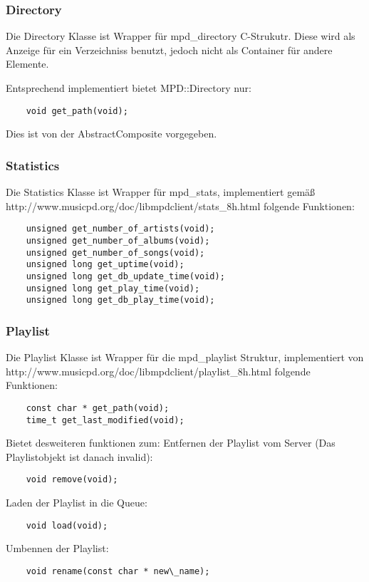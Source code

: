 \subsubsection{Directory}
Die Directory Klasse ist Wrapper für mpd\_directory C-Strukutr. Diese wird als Anzeige für ein Verzeichniss benutzt,
jedoch nicht als Container für andere Elemente.

Entsprechend implementiert bietet MPD::Directory nur:
\begin{verbatim}
    void get_path(void);
\end{verbatim}

Dies ist von der AbstractComposite vorgegeben.

\newpage
\subsubsection{Statistics}
Die Statistics Klasse ist Wrapper für mpd\_stats, implementiert gemäß
\\http://www.musicpd.org/doc/libmpdclient/stats\_8h.html
folgende Funktionen:
\begin{verbatim}
    unsigned get_number_of_artists(void);
    unsigned get_number_of_albums(void);
    unsigned get_number_of_songs(void);
    unsigned long get_uptime(void);
    unsigned long get_db_update_time(void);
    unsigned long get_play_time(void);
    unsigned long get_db_play_time(void);
\end{verbatim}


\subsubsection{Playlist}
Die Playlist Klasse ist Wrapper für die mpd\_playlist Struktur, implementiert von http://www.musicpd.org/doc/libmpdclient/playlist\_8h.html folgende Funktionen:
\begin{verbatim}
    const char * get_path(void);
    time_t get_last_modified(void);
\end{verbatim}

Bietet desweiteren funktionen zum:
Entfernen der Playlist vom Server (Das Playlistobjekt ist danach invalid):
\begin{verbatim}
    void remove(void);
\end{verbatim}

Laden der Playlist in die Queue:
\begin{verbatim}
    void load(void);
\end{verbatim}

Umbennen der Playlist:
\begin{verbatim}
    void rename(const char * new\_name);
\end{verbatim}

